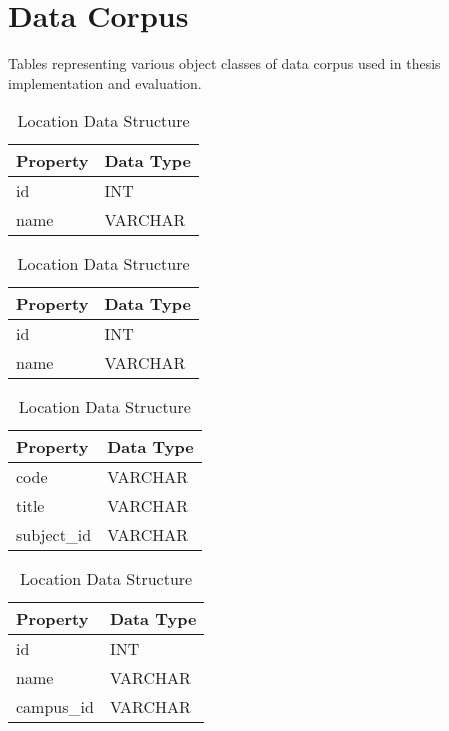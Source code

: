 \chapter{Data Corpus}
\label{chap:data-corpus-def}
	Tables representing various object classes of data corpus used in thesis implementation and evaluation.
	
	\begin{table}[H]
		\begin{subtable}[b]{.5\linewidth}
			\centering
			\begin{tabular}{ll}
				\toprule
				Property & Data Type \\
				\midrule
				id & INT \\
				name & VARCHAR \\
				\bottomrule
			\end{tabular}
			
			\caption{Campus Data Structure}
			\label{tbl:corpus-campus}
		\end{subtable}
		\begin{subtable}[b]{.5\linewidth}
			\centering
			\begin{tabular}{ll}
				\toprule
				Property & Data Type \\
				\midrule
				id & INT \\
				name & VARCHAR \\
				\bottomrule
			\end{tabular}
			
			\caption{Instructor Data Structure}
			\label{tbl:corpus-instructor}
		\end{subtable}
		\begin{subtable}[b]{.5\linewidth}
			\centering
			\begin{tabular}{ll}
				\toprule
				Property & Data Type \\
				\midrule
				code & VARCHAR \\
				title & VARCHAR \\
				subject\_id & VARCHAR \\
				\bottomrule
			\end{tabular}
			
			\caption{Course Data Structure}
			\label{tbl:corpus-course}
		\end{subtable}
		\begin{subtable}[b]{.5\linewidth}
			\centering
			\begin{tabular}{ll}
				\toprule
				Property & Data Type \\
				\midrule
				id & INT \\
				name & VARCHAR \\
				campus\_id & VARCHAR \\
				\bottomrule
			\end{tabular}
			
			\caption{Location Data Structure}
			\label{tbl:corpus-location}
		\end{subtable}
	\end{table}
	
